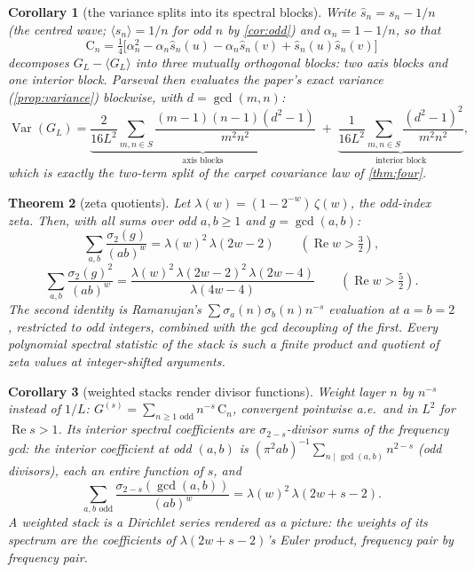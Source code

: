 \documentclass[11pt]{amsart}
\newtheorem{theorem}{Theorem}[section]
\newtheorem{corollary}[theorem]{Corollary}
\theoremstyle{definition}
\theoremstyle{remark}
\begin{document}
\begin{corollary}[the variance splits into its spectral blocks]
\label{cor:parseval}
Write $\widehat{s}_n = s_n - 1/n$ (the centred wave; $\langle s_n \rangle = 1/n$ for odd $n$ by \cref{cor:odd}) and $\alpha_n = 1 - 1/n$, so that
\[
\mathrm{C}_n = \tfrac14\bigl[ \alpha_n^2 - \alpha_n \widehat{s}_n(u) - \alpha_n \widehat{s}_n(v) + \widehat{s}_n(u)\widehat{s}_n(v) \bigr]
\]
decomposes $G_L - \langle G_L \rangle$ into three mutually orthogonal blocks: two axis blocks and one interior block. Parseval then evaluates the paper's exact variance (\cref{prop:variance}) blockwise, with $d = \gcd(m,n)$:
\[
\operatorname{Var}(G_L) = \underbrace{\frac{2}{16L^2} \sum_{m,n \in S} \frac{(m-1)(n-1)(d^2-1)}{m^2n^2}}_{\text{axis blocks}} \; + \; \underbrace{\frac{1}{16L^2} \sum_{m,n \in S} \frac{(d^2-1)^2}{m^2n^2}}_{\text{interior block}},
\]
which is exactly the two-term split of the carpet covariance law of \cref{thm:four}.
\end{corollary}

\begin{theorem}[zeta quotients]
\label{thm:zetaquot}
Let $\lambda(w) = (1 - 2^{-w})\,\zeta(w)$, the odd-index zeta. Then, with all sums over odd $a, b \ge 1$ and $g = \gcd(a,b)$:
\[
\sum_{a,b} \frac{\sigma_2(g)}{(ab)^w} = \lambda(w)^2\, \lambda(2w-2) \qquad (\operatorname{Re} w > \tfrac32),
\]
\[
\sum_{a,b} \frac{\sigma_2(g)^2}{(ab)^w} = \frac{\lambda(w)^2\, \lambda(2w-2)^2\, \lambda(2w-4)}{\lambda(4w-4)} \qquad (\operatorname{Re} w > \tfrac52).
\]
The second identity is Ramanujan's $\sum \sigma_a(n)\sigma_b(n) n^{-s}$ evaluation at $a = b = 2$, restricted to odd integers, combined with the gcd decoupling of the first. Every polynomial spectral statistic of the stack is such a finite product and quotient of zeta values at integer-shifted arguments.
\end{theorem}

\begin{corollary}[weighted stacks render divisor functions]
\label{cor:weighted}
Weight layer $n$ by $n^{-s}$ instead of $1/L$: $G^{(s)} = \sum_{n \ge 1 \text{ odd}} n^{-s}\, \mathrm{C}_n$, convergent pointwise a.e.\ and in $L^2$ for $\operatorname{Re} s > 1$. Its interior spectral coefficients are $\sigma_{2-s}$-divisor sums of the frequency gcd: the interior coefficient at odd $(a,b)$ is $(\pi^2 ab)^{-1} \sum_{n \mid \gcd(a,b)} n^{2-s}$ (odd divisors), each an entire function of $s$, and
\[
\sum_{a,b \text{ odd}} \frac{\sigma_{2-s}(\gcd(a,b))}{(ab)^{w}} = \lambda(w)^2\, \lambda(2w + s - 2).
\]
A weighted stack is a Dirichlet series rendered as a picture: the weights of its spectrum are the coefficients of $\lambda(2w+s-2)$'s Euler product, frequency pair by frequency pair.
\end{corollary}
\end{document}
